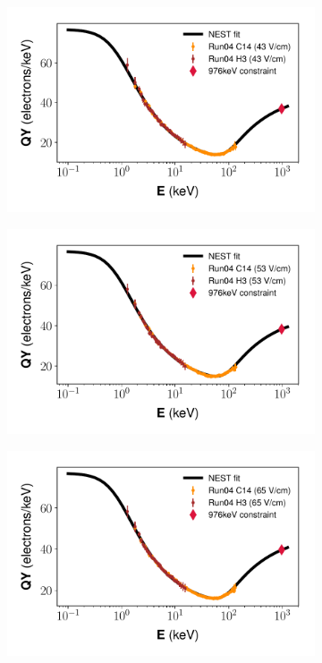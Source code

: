 \begin{figure}[h!]
\centering
\begin{subfigure}{0.5\textwidth}
  \centering
  \includegraphics[width=\textwidth]{Figures/Yields_fit_old/NEST_fit_43Vcm_old.pdf}
  \caption{}
\end{subfigure}%
\begin{subfigure}{0.5\textwidth}
  \centering
  \includegraphics[width=\textwidth]{Figures/Yields_fit_old/NEST_fit_53Vcm_old.pdf}
  \caption{}
\end{subfigure}
\begin{subfigure}{0.5\textwidth}
  \centering
  \includegraphics[width=\textwidth]{Figures/Yields_fit_old/NEST_fit_65Vcm_old.pdf}

\end{subfigure}
\end{figure}
